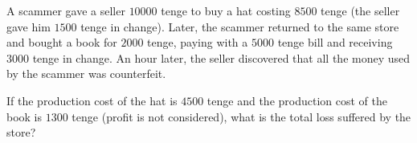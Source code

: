 A scammer gave a seller $10000$ tenge to buy a hat costing $8500$ tenge (the seller gave him $1500$ tenge in change). Later, the scammer returned to the same store and bought a book for $2000$ tenge, paying with a $5000$ tenge bill and receiving $3000$ tenge in change. An hour later, the seller discovered that all the money used by the scammer was counterfeit.



If the production cost of the hat is $4500$ tenge and the production cost of the book is $1300$ tenge (profit is not considered), what is the total loss suffered by the store?
